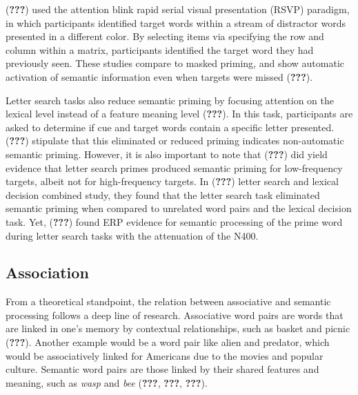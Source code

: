 \documentclass[english,man]{apa6}
\theoremstyle{definition}
\theoremstyle{definition}
\theoremstyle{definition}
\theoremstyle{remark}
\begin{document}
({\textbf{???}}) used the attention blink rapid serial visual
presentation (RSVP) paradigm, in which participants identified target
words within a stream of distractor words presented in a different
color. By selecting items via specifying the row and column within a
matrix, participants identified the target word they had previously
seen. These studies compare to masked priming, and show automatic
activation of semantic information even when targets were missed
({\textbf{???}}).

Letter search tasks also reduce semantic priming by focusing attention
on the lexical level instead of a feature meaning level
({\textbf{???}}). In this task, participants are asked to determine if
cue and target words contain a specific letter presented.
({\textbf{???}}) stipulate that this eliminated or reduced priming
indicates non-automatic semantic priming. However, it is also important
to note that ({\textbf{???}}) did yield evidence that letter search
primes produced semantic priming for low-frequency targets, albeit not
for high-frequency targets. In ({\textbf{???}}) letter search and
lexical decision combined study, they found that the letter search task
eliminated semantic priming when compared to unrelated word pairs and
the lexical decision task. Yet, ({\textbf{???}}) found ERP evidence for
semantic processing of the prime word during letter search tasks with
the attenuation of the N400.

\subsection{Association}\label{association}

From a theoretical standpoint, the relation between associative and
semantic processing follows a deep line of research. Associative word
pairs are words that are linked in one's memory by contextual
relationships, such as basket and picnic ({\textbf{???}}). Another
example would be a word pair like alien and predator, which would be
associatively linked for Americans due to the movies and popular
culture. Semantic word pairs are those linked by their shared features
and meaning, such as \emph{wasp} and \emph{bee} ({\textbf{???}},
{\textbf{???}}, {\textbf{???}}).
\end{document}
